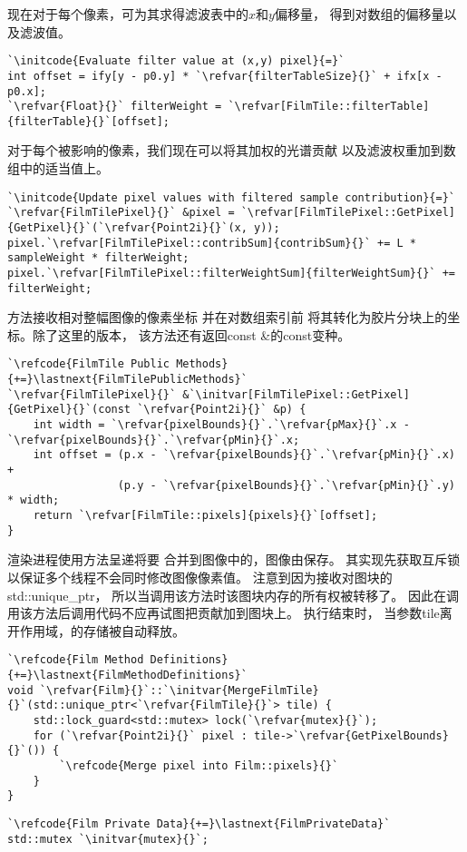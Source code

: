 现在对于每个像素，可为其求得滤波表中的$x$和$y$偏移量，
得到对数组的偏移量以及滤波值。
\begin{lstlisting}
`\initcode{Evaluate filter value at (x,y) pixel}{=}`
int offset = ify[y - p0.y] * `\refvar{filterTableSize}{}` + ifx[x - p0.x];
`\refvar{Float}{}` filterWeight = `\refvar[FilmTile::filterTable]{filterTable}{}`[offset];
\end{lstlisting}

对于每个被影响的像素，我们现在可以将其加权的光谱贡献
以及滤波权重加到数组中的适当值上。
\begin{lstlisting}
`\initcode{Update pixel values with filtered sample contribution}{=}`
`\refvar{FilmTilePixel}{}` &pixel = `\refvar[FilmTilePixel::GetPixel]{GetPixel}{}`(`\refvar{Point2i}{}`(x, y));
pixel.`\refvar[FilmTilePixel::contribSum]{contribSum}{}` += L * sampleWeight * filterWeight;
pixel.`\refvar[FilmTilePixel::filterWeightSum]{filterWeightSum}{}` += filterWeight;
\end{lstlisting}

方法接收相对整幅图像的像素坐标
并在对数组索引前
将其转化为胶片分块上的坐标。除了这里的版本，
该方法还有返回{\ttfamily const  \&}的{\ttfamily const}变种。
\begin{lstlisting}
`\refcode{FilmTile Public Methods}{+=}\lastnext{FilmTilePublicMethods}`
`\refvar{FilmTilePixel}{}` &`\initvar[FilmTilePixel::GetPixel]{GetPixel}{}`(const `\refvar{Point2i}{}` &p) {
    int width = `\refvar{pixelBounds}{}`.`\refvar{pMax}{}`.x - `\refvar{pixelBounds}{}`.`\refvar{pMin}{}`.x;
    int offset = (p.x - `\refvar{pixelBounds}{}`.`\refvar{pMin}{}`.x) +
                 (p.y - `\refvar{pixelBounds}{}`.`\refvar{pMin}{}`.y) * width;
    return `\refvar[FilmTile::pixels]{pixels}{}`[offset];
}
\end{lstlisting}

渲染进程使用方法呈递将要
合并到图像中的，图像由保存。
其实现先获取互斥锁以保证多个线程不会同时修改图像像素值。
注意到因为接收对图块的{\ttfamily std::unique\_ptr}，
所以当调用该方法时该图块内存的所有权被转移了。
因此在调用该方法后调用代码不应再试图把贡献加到图块上。
执行结束时，
当参数{\ttfamily tile}离开作用域，的存储被自动释放。
\begin{lstlisting}
`\refcode{Film Method Definitions}{+=}\lastnext{FilmMethodDefinitions}`
void `\refvar{Film}{}`::`\initvar{MergeFilmTile}{}`(std::unique_ptr<`\refvar{FilmTile}{}`> tile) {
    std::lock_guard<std::mutex> lock(`\refvar{mutex}{}`);
    for (`\refvar{Point2i}{}` pixel : tile->`\refvar{GetPixelBounds}{}`()) {
        `\refcode{Merge pixel into Film::pixels}{}`
    }
}
\end{lstlisting}
\begin{lstlisting}
`\refcode{Film Private Data}{+=}\lastnext{FilmPrivateData}`
std::mutex `\initvar{mutex}{}`;
\end{lstlisting}

